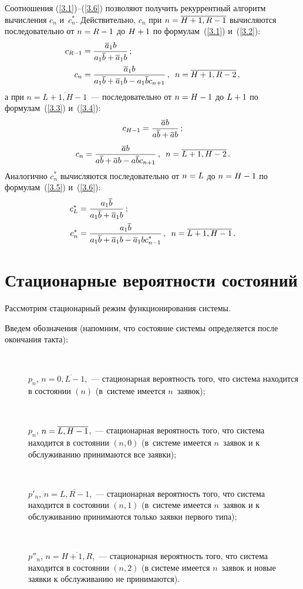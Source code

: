 \begin{multicols}{2}
Соотношения (\ref{3.1})--(\ref{3.6}) позволяют
получить рекуррентный алгоритм вычисления $c_n$ и~$c^*_n$.
Действительно, $c_n$ при ${n\hm=\overline{H+1,R-1}}$
вычисляются последовательно от $n\hm=R\hm-1$ до $H\hm+1$ по
формулам~(\ref{3.1}) и~(\ref{3.2}):
\begin{align*}
c_{R-1} &= \displaystyle\frac{\displaystyle \overline{a}_1 b\mathstrut}{\displaystyle a_1 \overline{b} + \overline{a}_1 b\mathstrut}
\,;
\\
c_{n} &= \displaystyle\frac{\displaystyle \overline{a}_1 b \mathstrut}{\displaystyle a_1 \overline{b} + \overline{a}_1 b -
a_1 \overline{b} c_{n+1}\mathstrut}\,,\enskip n=\overline{H+1,R-2}\,,
\end{align*}
а при $n=\overline{L+1,H-1}$~---
последовательно от $n\hm=H\hm-1$ до $L\hm+1$ по формулам~(\ref{3.3}) и~(\ref{3.4}):
$$
c_{H-1}= \displaystyle\frac{\displaystyle \overline{a} b\mathstrut}{\displaystyle a \overline{b} + \overline{a} b\mathstrut} \,;
$$
$$
c_{n}= \displaystyle\frac{\displaystyle \overline{a} b \mathstrut}{\displaystyle a \overline{b} + \overline{a} b - a \overline{b} c_{n+1}\mathstrut}\,,\enskip
n=\overline{L+1,H-2}\,.
$$
Аналогично $c^*_n$ вычисляются последовательно
от $n\hm=L$ до ${n\hm=H\hm-1}$ по формулам~(\ref{3.5}) и~(\ref{3.6}):
\begin{align*}
c^*_{L}&= \displaystyle\frac{\displaystyle a_1 \overline{b}\mathstrut}{\displaystyle a_1 \overline{b} + \overline{a}_1 b\mathstrut}\,;
\\
c^*_{n}&= \displaystyle\frac{\displaystyle a_1 \overline{b}\mathstrut}{\displaystyle a_1 \overline{b} + \overline{a}_1 b - \overline{a}_1 b c^*_{n-1}\mathstrut}
\,,\enskip  n=\overline{L+1,H-1}\,.
\end{align*}

\section{Стационарные вероятности состояний}

Рассмотрим стационарный режим функционирования системы.

Введем обозначения (напомним, что состояние системы
определяется после окончания такта):
\begin{description}
\item[\,] $p_n$, $n=\overline{0,L-1}$,~--- стационарная
вероятность того, что сис\-те\-ма находится в
состоянии $(n)$ (в~сис\-те\-ме имеется $n$~заявок);
\item[\,]
$p_n$, $n\hm=\overline{L,H-1}$,~--- стационарная
вероятность того, что сис\-те\-ма находится в
состоянии $(n,0)$
(в~сис\-те\-ме имеется $n$~заявок и к обслуживанию
принимаются все заявки);
\item[\,]
$p'_n$, $n=\overline{L,R-1}$,~--- стационарная
вероятность того, что сис\-те\-ма находится в
состоянии $(n,1)$ (в~сис\-те\-ме имеется $n$~заявок и к обслуживанию
принимаются только заявки первого типа);
\item[\,]
$p''_n$, $n=\overline{H+1,R}$,~--- стационарная
вероятность того, что сис\-те\-ма находится в
состоянии $(n,2)$
(в сис\-те\-ме имеется $n$~заявок и новые заявки к
обслуживанию не принимаются).
\end{description}


\end{multicols}
